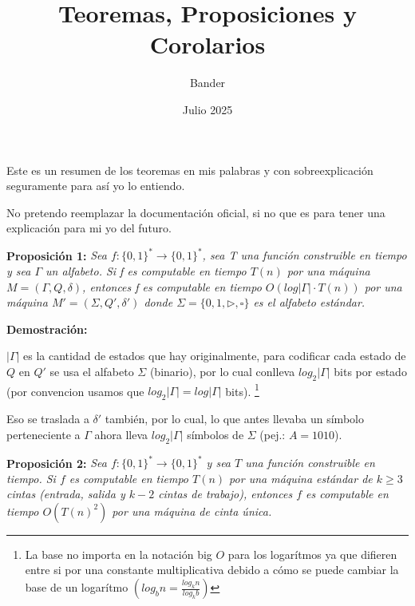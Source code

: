 \documentclass{article}
\title{Teoremas, Proposiciones y Corolarios}
\author{Bander}
\date{Julio 2025}
\begin{document}
\maketitle

\begin{flushleft}
  Este es un resumen de los teoremas en mis palabras y con sobreexplicación seguramente para así 
  yo lo entiendo. 

  No pretendo reemplazar la documentación oficial, si no que es para tener una explicación para 
  mi yo del futuro.
\end{flushleft}

\pagebreak

\begin{flushleft}
  \textbf{Proposición 1:} 
  \textit{Sea $f : \{0,1\}^* \rightarrow \{0,1\}^*$, sea T una función construible en
  tiempo y sea $\Gamma$ un alfabeto. Si f es computable en tiempo $T(n)$ por una máquina $M = 
  (\Gamma, Q, \delta)$, entonces f es computable en tiempo $O(log|\Gamma| \cdot T(n))$ por 
  una máquina $M' = (\Sigma, Q', \delta')$ donde $\Sigma = \{0,1,\triangleright, \square \}$
  es el alfabeto estándar.}
\end{flushleft}

\begin{flushleft}
  \textbf{\textcolor{Mulberry}{Demostración:}}

  $|\Gamma|$ es la cantidad de estados que hay originalmente, para codificar cada estado de $Q$
  en $Q'$ se usa el alfabeto $\Sigma$ (binario), por lo cual conlleva $log_2|\Gamma|$ bits por
  estado (por convencion usamos que $log_2|\Gamma| = log|\Gamma|$ bits).
  \footnote{La base  no importa en la notación big $O$ para los logarítmos ya que difieren entre
  si por una constante multiplicativa debido a cómo se puede cambiar la base de un logarítmo 
  $(log_b n = \frac{log_k n}{log_k b})$}

  Eso se traslada a $\delta'$  también, por lo cual, lo que antes llevaba un símbolo perteneciente a 
  $\Gamma$ ahora lleva $log_2|\Gamma|$ símbolos de $\Sigma$ (pej.: $A = 1010$).
\end{flushleft}

\begin{flushleft}
  \textbf{\hypertarget{prop2}{Proposición 2:}} 
  \textit{Sea $f : \{0,1\}^* \rightarrow \{0,1\}^*$ y sea $T$ una función construible en tiempo. 
  Si $f$ es computable en tiempo $T(n)$ por una máquina estándar de $k \geq 3$ cintas (entrada, 
  salida y $k - 2$ cintas de trabajo), entonces $f$ es computable en tiempo $O(T(n)^2)$ por una 
  máquina de cinta única.}
\end{flushleft}
\end{document}
